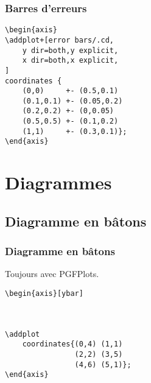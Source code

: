 \documentclass{clic_latex_beamer}
\begin{document}
\begin{frame}[fragile]
\frametitle{Barres d'erreurs}
\begin{multicols}{2}

\columnbreak

\begin{lstlisting}
\begin{axis}
\addplot+[error bars/.cd,
    y dir=both,y explicit,
    x dir=both,x explicit,
]
coordinates {
    (0,0)     +- (0.5,0.1)
    (0.1,0.1) +- (0.05,0.2)
    (0.2,0.2) +- (0,0.05)
    (0.5,0.5) +- (0.1,0.2)
    (1,1)     +- (0.3,0.1)};
\end{axis}
\end{lstlisting}

\end{multicols}

\end{frame}
\section{Diagrammes}
\subsection{Diagramme en bâtons}
\begin{frame}[fragile]
\frametitle{Diagramme en bâtons}
Toujours avec PGFPlots.
\begin{multicols}{2}


\columnbreak

\begin{lstlisting}
\begin{axis}[ybar]



\addplot
    coordinates{(0,4) (1,1)
                (2,2) (3,5)
                (4,6) (5,1)};
\end{axis}
\end{lstlisting}

\end{multicols}

\end{frame}
\end{document}
